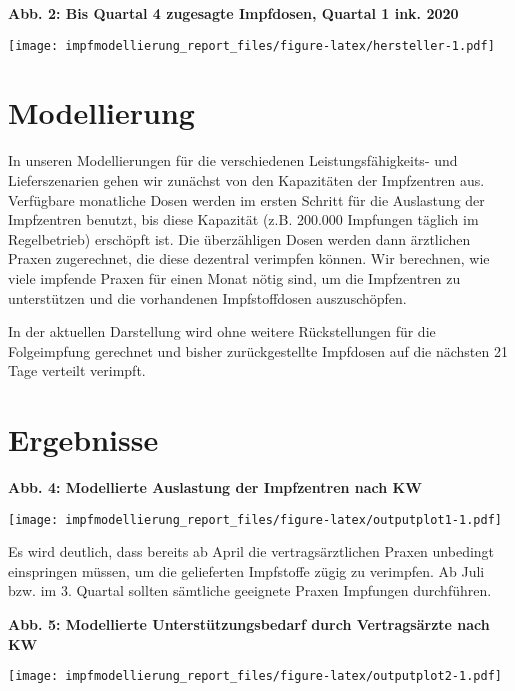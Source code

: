 \documentclass[
]{article}
\begin{document}
\textbf{Abb. 2: Bis Quartal 4 zugesagte Impfdosen, Quartal 1 ink. 2020}

\texttt{[image: impfmodellierung\_report\_files/figure-latex/hersteller-1.pdf]}

\hypertarget{modellierung}{%
\section{Modellierung}\label{modellierung}}

In unseren Modellierungen für die verschiedenen Leistungsfähigkeits- und
Lieferszenarien gehen wir zunächst von den Kapazitäten der Impfzentren
aus. Verfügbare monatliche Dosen werden im ersten Schritt für die
Auslastung der Impfzentren benutzt, bis diese Kapazität (z.B. 200.000
Impfungen täglich im Regelbetrieb) erschöpft ist. Die überzähligen Dosen
werden dann ärztlichen Praxen zugerechnet, die diese dezentral verimpfen
können. Wir berechnen, wie viele impfende Praxen für einen Monat nötig
sind, um die Impfzentren zu unterstützen und die vorhandenen
Impfstoffdosen auszuschöpfen.

In der aktuellen Darstellung wird ohne weitere Rückstellungen für die
Folgeimpfung gerechnet und bisher zurückgestellte Impfdosen auf die
nächsten 21 Tage verteilt verimpft.

\hypertarget{ergebnisse}{%
\section{Ergebnisse}\label{ergebnisse}}

\textbf{Abb. 4: Modellierte Auslastung der Impfzentren nach KW}

\texttt{[image: impfmodellierung\_report\_files/figure-latex/outputplot1-1.pdf]}

Es wird deutlich, dass bereits ab April die vertragsärztlichen Praxen
unbedingt einspringen müssen, um die gelieferten Impfstoffe zügig zu
verimpfen. Ab Juli bzw. im 3. Quartal sollten sämtliche geeignete Praxen
Impfungen durchführen.

\textbf{Abb. 5: Modellierte Unterstützungsbedarf durch Vertragsärzte
nach KW}

\texttt{[image: impfmodellierung\_report\_files/figure-latex/outputplot2-1.pdf]}
\end{document}
